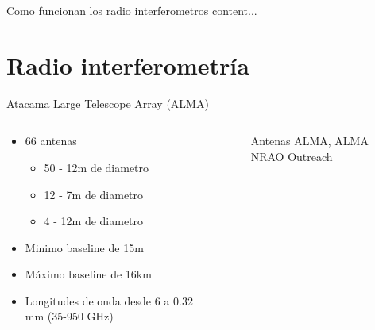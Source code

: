\documentclass[xetex,aspectratio=169]{beamer}
\begin{document}
	\begin{frame}{Como funcionan los radio interferometros}
		content...
	\end{frame}
	
    \section{Radio interferometría}
    \begin{frame}{Atacama Large Telescope Array (ALMA)}
    	\begin{columns}
    		\begin{column}{0.48\textwidth}
    			\begin{itemize}
    				\item 66 antenas
    				\begin{itemize}
    					\item 50 - 12m de diametro
    					\item 12 - 7m de diametro
    					\item 4 - 12m de diametro
    				\end{itemize}
    				\item Minimo baseline de 15m
    				\item Máximo baseline de 16km
    				\item Longitudes de onda desde 6 a 0.32 mm (35-950 GHz)
    			\end{itemize}
    		\end{column}
    		\begin{column}{0.48\textwidth}
    			\begin{figure}
    				\centering		
    				\caption{Antenas ALMA, ALMA NRAO Outreach}
    		\end{figure}
    		\end{column}
    	\end{columns}
    \end{frame}
\end{document}
